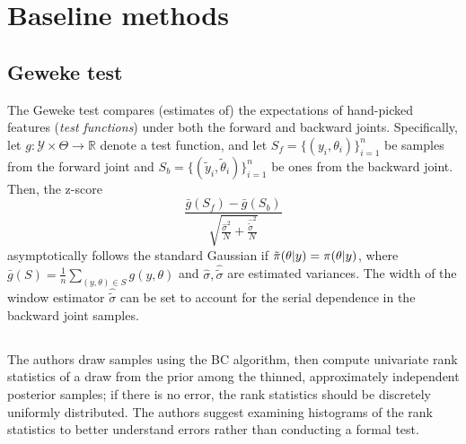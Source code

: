 \documentclass{article}
\begin{document}

\appendix

\section{Baseline methods}
\subsection{Geweke test}
The Geweke test \citep{geweke_getting_2004} compares (estimates of) the expectations of hand-picked features (\emph{test functions}) under both the forward and backward joints. 
Specifically, let $g: \mathcal{Y}\times \Theta\to \mathbb{R}$ denote a test function, and let  $S_f=\{(y_i, \theta_i)\}_{i=1}^n$ be samples from the forward joint and $S_b=\{(\tilde{y}_i, \tilde{\theta}_i)\}_{i=1}^n$ be ones from the backward joint.
Then, the z-score 
\begin{equation}
    \frac{\bar{g}(S_f) - \bar{g}(S_b)}{\sqrt{ \frac{\hat{\sigma}^{2}}{N} + \frac{\hat{\tilde{\sigma}}^{2}}{N}}} 
    \label{eq:geweke}
\end{equation}
asymptotically follows the standard Gaussian if $\tilde{\pi}(\theta\vert y)=\pi(\theta\vert y)$, where $\bar{g}(S) = \frac{1}{n}\sum_{(y,\theta) \in S}g(y, \theta)$ and $\hat{\sigma}, \hat{\tilde{\sigma}}$ are estimated variances. 
The width of the window estimator $\hat{\tilde{\sigma}}$ can be set to account for the serial dependence in the backward joint samples.
\subsection{\cite{talts_validating_2018}}
The authors draw samples using the BC algorithm, then compute univariate rank statistics of a draw from the prior among the thinned, approximately independent posterior samples; if there is no error, the rank statistics should be discretely uniformly distributed. 
The authors suggest examining histograms of the rank statistics to better understand errors rather than conducting a formal test.
\end{document}
